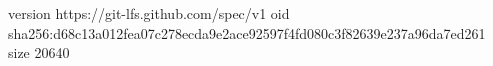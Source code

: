 version https://git-lfs.github.com/spec/v1
oid sha256:d68c13a012fea07c278ecda9e2ace92597f4fd080c3f82639e237a96da7ed261
size 20640
